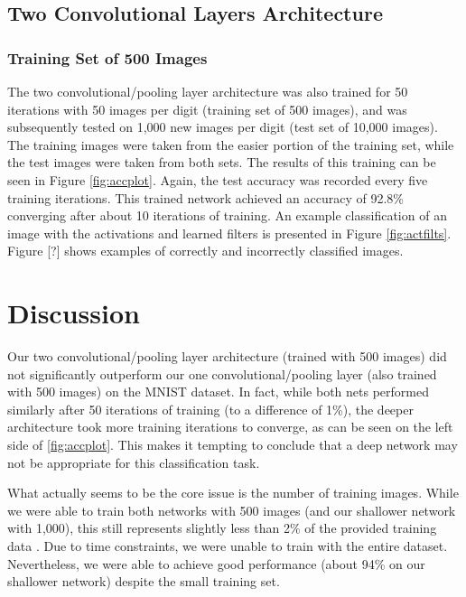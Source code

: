 \documentclass[10pt,twocolumn,letterpaper]{article}
\begin{document}
\subsection{Two Convolutional Layers Architecture}

\subsubsection{Training Set of 500 Images}

The two convolutional/pooling layer architecture was also trained for 50 iterations with 50 images per digit
(training set of 500 images), and was subsequently tested on 1,000 new images per digit
(test set of 10,000 images).
The training images were taken from the easier portion of the training set,
while the test images were taken from both sets.
The results of this training can be seen in Figure \ref{fig:accplot}.
Again, the test accuracy was recorded every five training iterations. This trained network achieved an accuracy of 92.8\% converging after about 10 iterations of training.
An example 
classification of an image with the activations and learned filters is presented
in Figure \ref{fig:actfilts}.
Figure [?] shows examples of correctly and incorrectly classified images.

\section{Discussion}

Our two convolutional/pooling layer architecture (trained with 500 images) did not significantly outperform
our one convolutional/pooling layer (also trained with 500 images) on the MNIST dataset. In fact, while both nets
performed similarly after 50 iterations of training (to a difference of 1\%), the deeper architecture took more
training iterations to converge, as can be seen on the left side of \ref{fig:accplot}.
This makes it tempting to conclude that a deep network may not be appropriate for this classification task.

What actually seems to be the core issue is the number of training images. While we were able to train both
networks with 500 images (and our shallower network with 1,000), this still represents slightly less than 2\% of
the provided training data \cite{MNIST}. Due to time constraints, we were unable to train with the entire dataset.
Nevertheless, we were able to achieve good performance (about 94\% on our shallower network) despite the small
training set.
\end{document}
